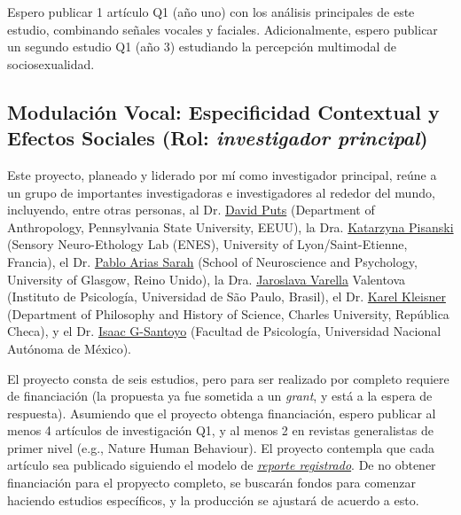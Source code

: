 \documentclass[11pt,a4paper,]{awesome-cv}
\begin{document}
\begin{footnotesize}

Espero publicar 1 artículo Q1 (año uno) con los análisis principales de este estudio, combinando señales vocales y faciales. Adicionalmente, espero publicar un segundo estudio Q1 (año 3) estudiando la percepción multimodal de sociosexualidad.

\end{footnotesize}

\hypertarget{modulaciuxf3n-vocal-especificidad-contextual-y-efectos-sociales-rol-investigador-principal}{%
\subsection{\texorpdfstring{Modulación Vocal: Especificidad Contextual y
Efectos Sociales (Rol: \emph{investigador
principal})}{Modulación Vocal: Especificidad Contextual y Efectos Sociales (Rol: investigador principal)}}\label{modulaciuxf3n-vocal-especificidad-contextual-y-efectos-sociales-rol-investigador-principal}}

\begin{footnotesize}

Este proyecto, planeado y liderado por mí como investigador principal, reúne a un grupo de importantes investigadoras e investigadores al rededor del mundo, incluyendo, entre otras personas, al Dr. \href{https://scholar.google.com/citations?user=fZ_ZqrMAAAAJ}{David Puts} (Department of Anthropology, Pennsylvania State University, EEUU), la Dra. \href{https://scholar.google.com/citations?user=sTCqMrwAAAAJ}{Katarzyna Pisanski} (Sensory Neuro-Ethology Lab (ENES), University of Lyon/Saint-Etienne, Francia), el Dr. \href{https://scholar.google.com/citations?user=6jMFwJQAAAAJ}{Pablo Arias Sarah} (School of Neuroscience and Psychology, University of Glasgow, Reino Unido),  la Dra. \href{https://scholar.google.cz/citations?user=BaIq_QIAAAAJ}{Jaroslava Varella} Valentova (Instituto de Psicología, Universidad de São Paulo, Brasil), el Dr. \href{https://scholar.google.com/citations?user=ZtzwhVsAAAAJ}{Karel Kleisner} (Department of Philosophy and History of Science, Charles University, República Checa), y el Dr. \href{https://scholar.google.com/citations?user=nhsFlxAAAAAJ}{Isaac G-Santoyo} (Facultad de Psicología, Universidad Nacional Autónoma de México). 

El proyecto consta de seis estudios, pero para ser realizado por completo requiere de financiación (la propuesta ya fue sometida a un \textit{grant}, y está a la espera de respuesta). Asumiendo que el proyecto obtenga financiación, espero publicar al menos 4 artículos de investigación Q1, y al menos 2 en revistas generalistas de primer nivel (e.g., Nature Human Behaviour). El proyecto contempla que cada artículo sea publicado siguiendo el modelo de \href{https://www.nature.com/articles/s41562-021-01193-7}{\textit{reporte registrado}}. De no obtener financiación para el propyecto completo, se buscarán fondos para comenzar haciendo estudios específicos, y la producción se ajustará de acuerdo a esto.

\end{footnotesize}
\end{document}

